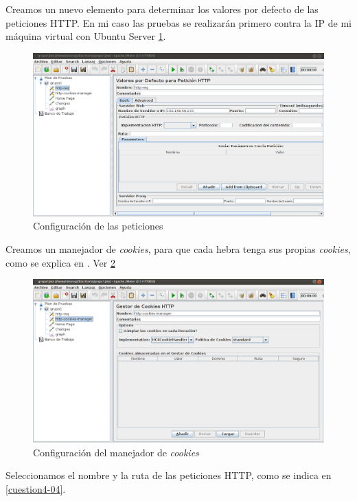 Creamos un nuevo elemento para determinar los valores por defecto de las peticiones HTTP. En mi caso las pruebas se realizarán primero contra la IP de mi máquina virtual con Ubuntu Server \ref{cuestion4-02}.

\begin{figure}[H]
	\centering
	\includegraphics[scale=0.4]{cuestion4-02.png}
	\caption{Configuración de las peticiones} \label{cuestion4-02}
\end{figure}

Creamos un manejador de \textit{cookies}, para que cada hebra tenga sus propias \textit{cookies}, como se explica en \cite{jmeter}. Ver \ref{cuestion4-03}

\begin{figure}[H]
	\centering
	\includegraphics[scale=0.4]{cuestion4-03.png}
	\caption{Configuración del manejador de \textit{cookies}} \label{cuestion4-03}
\end{figure}

Seleccionamos el nombre y la ruta de las peticiones HTTP, como se indica en \ref{cuestion4-04}.

